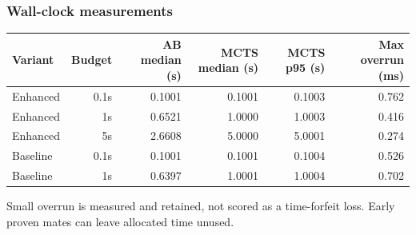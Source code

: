 \subsubsection*{Wall-clock measurements}
\begin{center}\small\setlength{\tabcolsep}{4pt}\begin{tabular}{lrrrrr}\toprule
Variant & Budget & AB median (s) & MCTS median (s) & MCTS p95 (s) & Max overrun (ms)\\\midrule
Enhanced & 0.1s & 0.1001 & 0.1001 & 0.1003 & 0.762 \\
Enhanced & 1s & 0.6521 & 1.0000 & 1.0003 & 0.416 \\
Enhanced & 5s & 2.6608 & 5.0000 & 5.0001 & 0.274 \\
Baseline & 0.1s & 0.1001 & 0.1001 & 0.1004 & 0.526 \\
Baseline & 1s & 0.6397 & 1.0001 & 1.0004 & 0.702 \\
\bottomrule\end{tabular}\end{center}
Small overrun is measured and retained, not scored as a time-forfeit loss. Early proven mates can leave allocated time unused.
